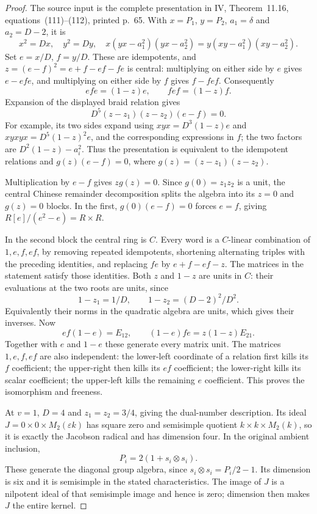 \documentclass[11pt,a4paper]{article}
\theoremstyle{named}\newtheorem{finding}{Finding}[section]
\theoremstyle{definition}\newtheorem{definition}[finding]{Definition}
\theoremstyle{remark}\newtheorem{remark}[finding]{Remark}
\begin{document}
\begin{proof}
The source input is the complete presentation in IV, Theorem~11.16, equations~(111)--(112), printed p.~65. With $x=P_1$, $y=P_2$, $a_1=\delta$ and $a_2=D-2$, it is
\[
 x^2=Dx,\quad y^2=Dy,\quad
 x(yx-a_1^2)(yx-a_2^2)=y(xy-a_1^2)(xy-a_2^2).
\]
Set $e=x/D$, $f=y/D$. These are idempotents, and $z=(e-f)^2=e+f-ef-fe$ is central: multiplying on either side by $e$ gives $e-efe$, and multiplying on either side by $f$ gives $f-fef$. Consequently
\[
 efe=(1-z)e,\qquad fef=(1-z)f.
\]
Expansion of the displayed braid relation gives
\[
 D^5(z-z_1)(z-z_2)(e-f)=0.
\]
For example, its two sides expand using $xyx=D^3(1-z)e$ and $xyxyx=D^5(1-z)^2e$, and the corresponding expressions in $f$; the two factors are $D^2(1-z)-a_i^2$. Thus the presentation is equivalent to the idempotent relations and $g(z)(e-f)=0$, where $g(z)=(z-z_1)(z-z_2)$.

Multiplication by $e-f$ gives $zg(z)=0$. Since $g(0)=z_1z_2$ is a unit, the central Chinese remainder decomposition splits the algebra into its $z=0$ and $g(z)=0$ blocks. In the first, $g(0)(e-f)=0$ forces $e=f$, giving $R[e]/(e^2-e)=R\times R$.

In the second block the central ring is $C$. Every word is a $C$-linear combination of $1,e,f,ef$, by removing repeated idempotents, shortening alternating triples with the preceding identities, and replacing $fe$ by $e+f-ef-z$. The matrices in the statement satisfy those identities. Both $z$ and $1-z$ are units in $C$: their evaluations at the two roots are units, since
\[
 1-z_1=1/D,\qquad 1-z_2=(D-2)^2/D^2.
\]
Equivalently their norms in the quadratic algebra are units, which gives their inverses. Now
\[
 ef(1-e)=E_{12},\qquad (1-e)fe=z(1-z)E_{21}.
\]
Together with $e$ and $1-e$ these generate every matrix unit. The matrices $1,e,f,ef$ are also independent: the lower-left coordinate of a relation first kills its $f$ coefficient; the upper-right then kills its $ef$ coefficient; the lower-right kills its scalar coefficient; the upper-left kills the remaining $e$ coefficient. This proves the isomorphism and freeness.

At $v=1$, $D=4$ and $z_1=z_2=3/4$, giving the dual-number description. Its ideal
$J=0\times0\times M_2(\varepsilon k)$ has square zero and semisimple quotient $k\times k\times M_2(k)$, so it is exactly the Jacobson radical and has dimension four. In the original ambient inclusion,
\[
 P_i=2(1+s_i\otimes s_i).
\]
These generate the diagonal group algebra, since $s_i\otimes s_i=P_i/2-1$. Its dimension is six and it is semisimple in the stated characteristics. The image of $J$ is a nilpotent ideal of that semisimple image and hence is zero; dimension then makes $J$ the entire kernel.


\end{proof}
\end{document}
